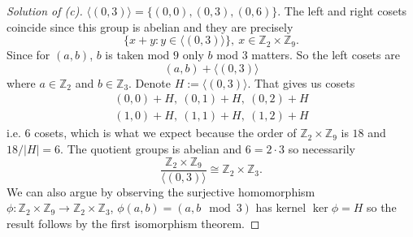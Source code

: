\begin{proof}[Solution of (c)]
    $\langle (0,3) \rangle = \{(0,0), (0,3), (0,6)\}$. 
    The left and right cosets coincide since this group 
    is abelian and they are precisely
    \[
        \{x + y : y \in \langle (0,3)\rangle \}, \ 
        x \in \mathbb Z_2 \times \mathbb Z_9.
    \]
    Since for $(a,b)$, $b$ is taken mod $9$ only $b$ mod 3 
    matters. 
    So the left cosets are 
    \[
        (a,b) + \langle (0,3) \rangle 
    \]
    where $a \in \mathbb Z_2$ and $b \in \mathbb Z_3$.
    Denote $H := \langle (0,3) \rangle$.
    That gives us cosets
    \begin{align*}
        (0,0) + H, \ (0,1) + H, \ (0,2) + H \\ 
        (1,0) + H, \ (1,1) + H, \ (1,2) + H 
    \end{align*}
    i.e. $6$ cosets, which is what we expect 
    because the order of $\mathbb Z_2 \times \mathbb Z_9$ is 
    $18$ and $18/|H| = 6$. The quotient groups is abelian 
    and $6 = 2 \cdot 3$ so necessarily 
    \[
        \frac{\mathbb Z_2 \times \mathbb Z_9}{\langle (0,3)\rangle} 
        \cong \mathbb Z_2 \times \mathbb Z_3.
    \]
    We can also argue by observing the surjective homomorphism 
    $\phi : \mathbb Z_2 \times \mathbb Z_9 \to 
    \mathbb Z_2 \times \mathbb Z_3$, $\phi(a,b) = (a, b\mod 3)$ 
    has kernel 
    $\ker \phi = H$ so the result follows by the first isomorphism 
    theorem.
\end{proof}

